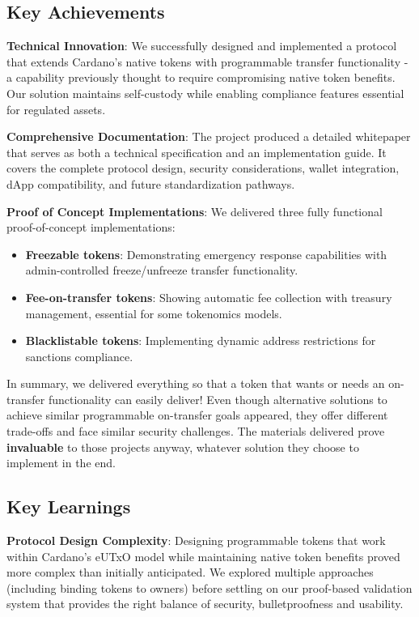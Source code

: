 \subsection{Key Achievements}
\noindent{}\textbf{Technical Innovation}: We successfully designed and implemented a protocol that extends Cardano's native tokens with programmable transfer functionality - a capability previously thought to require compromising native token benefits. Our solution maintains self-custody while enabling compliance features essential for regulated assets.

\medskip{}

\noindent{}\textbf{Comprehensive Documentation}: The project produced a detailed whitepaper that serves as both a technical specification and an implementation guide. It covers the complete protocol design, security considerations, wallet integration, dApp compatibility, and future standardization pathways.

\medskip{}

\noindent{}\textbf{Proof of Concept Implementations}: We delivered three fully functional proof-of-concept implementations:
\begin{itemize}
\item \textbf{Freezable tokens}: Demonstrating emergency response capabilities with admin-controlled freeze/unfreeze transfer functionality.
\item \textbf{Fee-on-transfer tokens}: Showing automatic fee collection with treasury management, essential for some tokenomics models.
\item \textbf{Blacklistable tokens}: Implementing dynamic address restrictions for sanctions compliance.
\end{itemize}

\medskip{}

\noindent{}In summary, we delivered everything so that a token that wants or needs an on-transfer functionality can easily deliver! Even though alternative solutions to achieve similar programmable on-transfer goals appeared, they offer different trade-offs and face similar security challenges. The materials delivered prove \textbf{invaluable} to those projects anyway, whatever solution they choose to implement in the end.

\subsection{Key Learnings}
\noindent{}\textbf{Protocol Design Complexity}: Designing programmable tokens that work within Cardano's eUTxO model while maintaining native token benefits proved more complex than initially anticipated. We explored multiple approaches (including binding tokens to owners) before settling on our proof-based validation system that provides the right balance of security, bulletproofness and usability.

